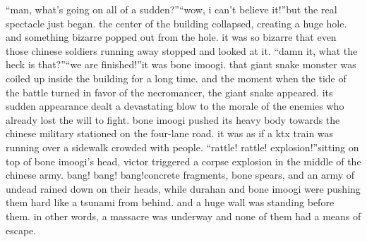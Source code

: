 “man, what’s going on all of a sudden?”“wow, i can’t believe it!”but the real spectacle just began.
the center of the building collapsed, creating a huge hole.
 and something bizarre popped out from the hole.
 it was so bizarre that even those chinese soldiers running away stopped and looked at it.
“damn it, what the heck is that?”“we are finished!”it was bone imoogi.
 that giant snake monster was coiled up inside the building for a long time.
 and the moment when the tide of the battle turned in favor of the necromancer, the giant snake appeared.
 its sudden appearance dealt a devastating blow to the morale of the enemies who already lost the will to fight.
bone imoogi pushed its heavy body towards the chinese military stationed on the four-lane road.
 it was as if a ktx train was running over a sidewalk crowded with people.
“rattle! rattle! explosion!”sitting on top of bone imoogi’s head, victor triggered a corpse explosion in the middle of the chinese army.
bang! bang! bang!concrete fragments, bone spears, and an army of undead rained down on their heads, while durahan and bone imoogi were pushing them hard like a tsunami from behind.
and a huge wall was standing before them.
in other words, a massacre was underway and none of them had a means of escape.

